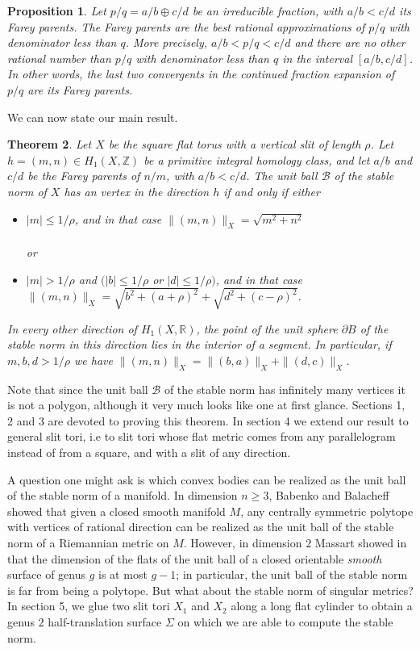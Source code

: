 \documentclass{article}
\newcommand{\RR}{\mathbb{R}}
\newcommand{\ZZ}{\mathbb{Z}}
\newcommand{\Bb}{\mathcal{B}}
\newcommand{\St}[1]{\|#1\|_X}
\newtheorem{thm}{Theorem}[section]
\newtheorem{prop}[thm]{Proposition}
\theoremstyle{definition}
\begin{document}
\begin{prop}
	Let $p/q = a/b \oplus c/d$ be an irreducible fraction, with $a/b<c/d$ its Farey parents. The Farey parents are the best rational approximations of $p/q$ with denominator less than $q$. More precisely, $a/b < p/q < c/d $ and there are no other rational number than $p/q$ with denominator less than $q$ in the interval $[a/b,c/d]$. In other words, the last two convergents in the continued fraction expansion of $p/q$ are its Farey parents.
\end{prop}

We can now state our main result.

\begin{thm}
Let $X$ be the square flat torus with a vertical slit of length $\rho$. Let $h=(m,n)\in H_1(X,\ZZ)$ be a primitive integral homology class, and let $a/b$ and $c/d$ be the Farey parents of $n/m$, with $a/b<c/d$. The unit ball $\Bb$ of the stable norm of $X$ has an vertex in the direction $h$ if and only if either

\begin{itemize}\renewcommand{\labelitemi}{$\bullet$}
\item $|m|\le 1/\rho$, and in that case $\St{(m,n)}=\sqrt{m^2+n^2}$ \\ \\
or
\item $|m|>1/\rho$ and $(|b|\le 1/\rho$ or $|d|\le 1/\rho)$, and in that case $\St{(m,n)}=\sqrt{b^2+(a+\rho)^2}+\sqrt{d^2+(c-\rho)^2}$. 
\end{itemize}
In every other direction of $H_1(X,\RR)$, the point of the unit sphere $\partial B$ of the stable norm in this direction lies in the interior of a segment. In particular, if $m,b,d> 1/\rho$ we have $\St{(m,n)}=\St{(b,a)}+\St{(d,c)}$.
\end{thm}

Note that since the unit ball $\Bb$ of the stable norm has infinitely many vertices it is not a polygon, although it very much looks like one at first glance. Sections 1, 2 and 3 are devoted to proving this theorem. In section 4 we extend our result to general slit tori, i.e to slit tori whose flat metric comes from any parallelogram instead of from a square, and with a slit of any direction. \newline 

A question one might ask is which convex bodies can be realized as the unit ball of the stable norm of a manifold. In dimension $n\ge 3$, Babenko and Balacheff showed that given a closed smooth manifold $M$, any centrally symmetric polytope with vertices of rational direction can be realized as the unit ball of the stable norm of a Riemannian metric on $M$.
However, in dimension $2$ Massart showed in \cite{Mas2} that the dimension of the flats of the unit ball of a closed orientable \emph{smooth} surface of genus $g$ is at most $g-1$; in particular, the unit ball of the stable norm is far from being a polytope. But what about the stable norm of singular metrics?
In section 5, we glue two slit tori $X_1$ and $X_2$ along a long flat cylinder to obtain a genus $2$ half-translation surface $\Sigma$ on which we are able to compute the stable norm.
\end{document}
